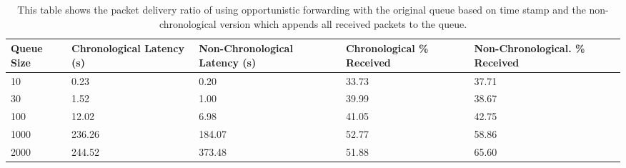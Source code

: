         \begin{table}[H]
            \begin{tabularx}{\linewidth}{|X|X|X|X|X|}
                \hline
                \multicolumn{1}{|X|}{\centering Queue Size} & 
                \multicolumn{1}{|X|}{\centering Chronological Latency (s)} & 
                \multicolumn{1}{|X|}{\centering Non-Chronological Latency (s)} & 
                \multicolumn{1}{|X|}{\centering Chronological \% Received} & 
                \multicolumn{1}{|X|}{\centering Non-Chronological. \% Received} \\
                \hline
                10 & 0.23 & 0.20 & 33.73 & 37.71 \\
                30 & 1.52 & 1.00 & 39.99 & 38.67 \\
                100 & 12.02 & 6.98 & 41.05 & 42.75 \\
                1000 & 236.26 & 184.07 & 52.77 & 58.86 \\
                2000 & 244.52 & 373.48 & 51.88 & 65.60 \\
                \hline
            \end{tabularx}
            \caption{This table shows the packet delivery ratio of using opportunistic forwarding with the original queue based on time stamp  and the non-chronological version which appends all received packets to the queue.}
            \label{tab:priority_queue}
        \end{table}

